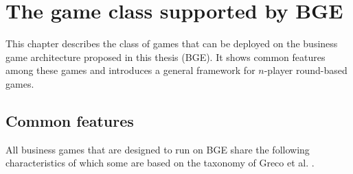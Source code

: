 

\chapter{The game class supported by BGE}
\label{cha:gameClass}
This chapter describes the class of games that can be deployed on the business game architecture proposed in this thesis (BGE). It shows common features among these games and introduces a general framework for $n$-player round-based games.
\section{Common features}
\label{sec:common}
All business games that are designed to run on BGE share the following characteristics of which some are based on the taxonomy of Greco et al. \cite{greco}.
